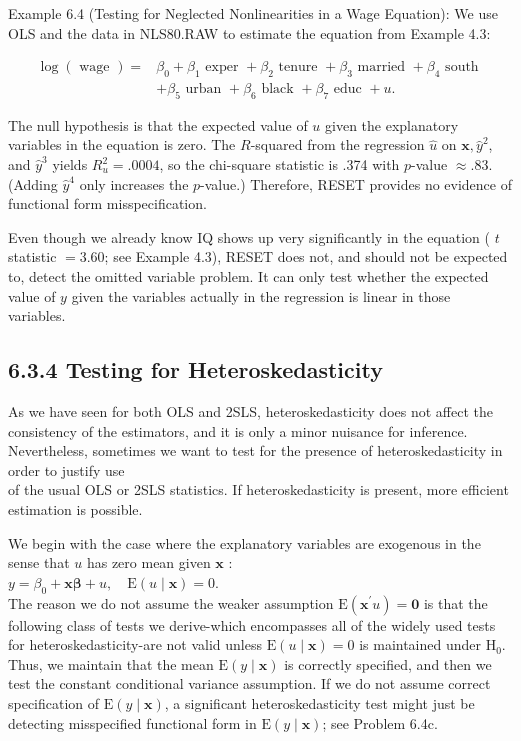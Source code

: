 \documentclass[10pt]{article}
\begin{document}
Example 6.4 (Testing for Neglected Nonlinearities in a Wage Equation): We use OLS and the data in NLS80.RAW to estimate the equation from Example 4.3:

$$
\begin{aligned}
\log (\text { wage })= & \beta_{0}+\beta_{1} \text { exper }+\beta_{2} \text { tenure }+\beta_{3} \text { married }+\beta_{4} \text { south } \\
& +\beta_{5} \text { urban }+\beta_{6} \text { black }+\beta_{7} \text { educ }+u .
\end{aligned}
$$

The null hypothesis is that the expected value of $u$ given the explanatory variables in the equation is zero. The $R$-squared from the regression $\hat{u}$ on $\mathbf{x}, \hat{y}^{2}$, and $\hat{y}^{3}$ yields $R_{u}^{2}=.0004$, so the chi-square statistic is .374 with $p$-value $\approx .83$. (Adding $\hat{y}^{4}$ only increases the $p$-value.) Therefore, RESET provides no evidence of functional form misspecification.

Even though we already know IQ shows up very significantly in the equation ( $t$ statistic $=3.60$; see Example 4.3), RESET does not, and should not be expected to, detect the omitted variable problem. It can only test whether the expected value of $y$ given the variables actually in the regression is linear in those variables.

\subsection*{6.3.4 Testing for Heteroskedasticity}
As we have seen for both OLS and 2SLS, heteroskedasticity does not affect the consistency of the estimators, and it is only a minor nuisance for inference. Nevertheless, sometimes we want to test for the presence of heteroskedasticity in order to justify use\\
of the usual OLS or 2SLS statistics. If heteroskedasticity is present, more efficient estimation is possible.

We begin with the case where the explanatory variables are exogenous in the sense that $u$ has zero mean given $\mathbf{x}$ :\\
$y=\beta_{0}+\mathbf{x} \boldsymbol{\beta}+u, \quad \mathrm{E}(u \mid \mathbf{x})=0$.\\
The reason we do not assume the weaker assumption $\mathrm{E}\left(\mathbf{x}^{\prime} u\right)=\mathbf{0}$ is that the following class of tests we derive-which encompasses all of the widely used tests for heteroskedasticity-are not valid unless $\mathrm{E}(u \mid \mathbf{x})=0$ is maintained under $\mathrm{H}_{0}$. Thus, we maintain that the mean $\mathrm{E}(y \mid \mathbf{x})$ is correctly specified, and then we test the constant conditional variance assumption. If we do not assume correct specification of $\mathrm{E}(y \mid \mathbf{x})$, a significant heteroskedasticity test might just be detecting misspecified functional form in $\mathrm{E}(y \mid \mathbf{x})$; see Problem 6.4c.
\end{document}
